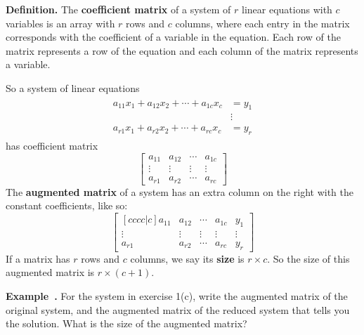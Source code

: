 \documentclass[11pt, letterpaper]{report}
\newcounter{exercise}[section]
\newcounter{example}[section]
\newcommand{\example}{\refstepcounter{example}%
\par\noindent\textbf{Example~\theexample.} }
\newenvironment{definition}{\begin{bbox}\par\noindent\textbf{Definition. }}
  {\end{bbox}}
\newlength\oldfboxsep%
\newlength\myminiwidth%
\newenvironment{bbox}{%
  \setlength\oldfboxsep\fboxsep
  \setlength{\fboxsep}{.1in}%
  \setlength\myminiwidth\linewidth%
  \addtolength\myminiwidth{-0.2in}%
  \vspace{0.1in}%
  \begin{lrbox}{\bboxbox}\begin{minipage}{\myminiwidth}%
    }{%
    \end{minipage}\end{lrbox}%
  \noindent\fbox{\usebox{\bboxbox}}\vspace{0.1in}\setlength\fboxsep\oldfboxsep%
}
\begin{document}
\begin{definition}
The \textbf{coefficient matrix} of a system of $r$ linear equations with $c$ variables is an array with $r$ rows and $c$ columns, where each entry in the matrix corresponds with the coefficient of a variable in the equation. Each row of the matrix represents a row of the equation and each column of the matrix represents a variable.


So a system of linear equations
\begin{align*}
  \begin{split}
    a_{11}x_1+a_{12}x_2+ \cdots + a_{1c}x_{c} &= y_1 \\
                                              &\vdots \\
    a_{r1}x_1+a_{r2}x_2+ \cdots + a_{rc}x_{c} &= y_r
  \end{split}
\end{align*}
has coefficient matrix
\[
\begin{bmatrix}
a_{11} & a_{12} & \cdots & a_{1c} \\
\vdots & \vdots & \vdots & \vdots \\
a_{r1} & a_{r2} & \cdots & a_{rc}
\end{bmatrix}
\]
The \textbf{augmented matrix} of a system has an extra column on the right with the constant coefficients, like so:
\[
\begin{bmatrix}[cccc|c]
a_{11} & a_{12} & \cdots & a_{1c} & y_1 \\
\vdots & \vdots & \vdots & \vdots & \vdots \\
a_{r1} & a_{r2} & \cdots & a_{rc} & y_{r}
\end{bmatrix}
\]
If a matrix has $r$ rows and $c$ columns, we say its \textbf{size} is $r \times c$. So the size of this augmented matrix is $r \times (c+1)$.
\end{definition}

\example For the system in exercise 1(c), write the augmented matrix of the original system, and the augmented matrix of the reduced system that tells you the solution. What is the size of the augmented matrix?
\end{document}
